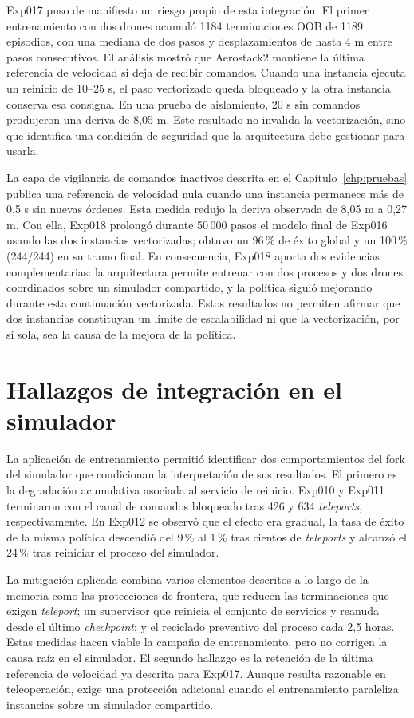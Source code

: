 Exp017 puso de manifiesto un riesgo propio de esta integración. El primer
entrenamiento con dos drones acumuló 1184 terminaciones OOB de 1189 episodios,
con una mediana de dos pasos y desplazamientos de hasta 4 m entre pasos
consecutivos. El análisis mostró que Aerostack2 mantiene la última referencia de
velocidad si deja de recibir comandos. Cuando una instancia ejecuta un reinicio
de 10--25 s, el paso vectorizado queda bloqueado y la otra instancia conserva
esa consigna. En una prueba de aislamiento, 20 s sin comandos produjeron una
deriva de 8,05 m. Este resultado no invalida la vectorización, sino que identifica
una condición de seguridad que la arquitectura debe gestionar para usarla.

La capa de vigilancia de comandos inactivos descrita en el
Capítulo~\ref{chp:pruebas} publica una referencia de velocidad nula cuando una
instancia permanece más de 0,5 s sin nuevas órdenes. Esta medida redujo la
deriva observada de 8,05 m a 0,27 m. Con ella, Exp018 prolongó durante 50\,000
pasos el modelo final de Exp016 usando las dos instancias vectorizadas; obtuvo
un 96\,\% de éxito global y un 100\,\% (244/244) en su tramo final. En
consecuencia, Exp018 aporta dos evidencias complementarias: la arquitectura permite
entrenar con dos procesos y dos drones coordinados sobre un simulador compartido,
y la política siguió mejorando durante esta continuación vectorizada. Estos
resultados no permiten afirmar que dos instancias constituyan un límite de
escalabilidad ni que la vectorización, por sí sola, sea la causa de la mejora de
la política.

\section{Hallazgos de integración en el simulador} \label{sct:resultados:hallazgos_simulador}

La aplicación de entrenamiento permitió identificar dos comportamientos del
fork del simulador que condicionan la interpretación de sus resultados. El
primero es la degradación acumulativa asociada al servicio de reinicio. Exp010 y
Exp011 terminaron con el canal de comandos bloqueado tras 426 y 634
\emph{teleports}, respectivamente. En Exp012 se observó que el efecto era
gradual, la tasa de éxito de la misma política descendió del 9\,\% al 1\,\% tras
cientos de \emph{teleports} y alcanzó el 24\,\% tras reiniciar el proceso del
simulador.

La mitigación aplicada combina varios elementos descritos a lo largo de la memoria como las protecciones de frontera, que reducen las
terminaciones que exigen \emph{teleport}; un supervisor que reinicia el conjunto
de servicios y reanuda desde el último \emph{checkpoint}; y el reciclado
preventivo del proceso cada 2,5 horas. Estas medidas hacen viable la campaña de
entrenamiento, pero no corrigen la causa raíz en el simulador. El segundo
hallazgo es la retención de la última referencia de velocidad ya descrita para
Exp017. Aunque resulta razonable en teleoperación, exige una protección adicional
cuando el entrenamiento paraleliza instancias sobre un simulador compartido.

